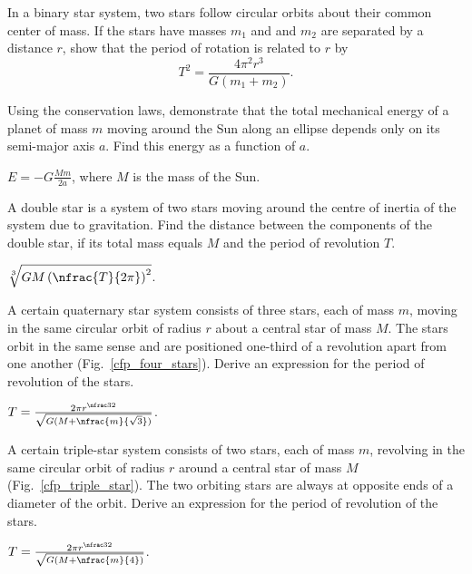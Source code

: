 \begin{problem}
	In a binary star system, two stars follow circular orbits
	about their common center of mass. If the stars have masses $m_1$ and
	and $m_2$ are separated by a distance $r$, show that the period of rotation
	is related to $r$ by
	\[
		T^2  = \frac{4\pi^2 r^3}{G(m_1 + m_2)}.
	\]
\end{problem}


\begin{problem}
	Using the conservation laws, demonstrate that the total 
	mechanical energy of a planet of mass $m$ moving around the Sun 
	along an ellipse depends only on its semi-major axis $a$. Find this 
	energy as a function of $a$. 
	\begin{solution}
		$E = - G\frac{Mm}{2a}$, where $M$ is the mass of the Sun. 		
	\end{solution}
\end{problem}


\begin{problem}
	A double star is a system of two stars moving around the 
	centre of inertia of the system due to gravitation. Find the distance 
	between the components of the double star, if its total mass equals $M$ 
	and the period of revolution $T$. 
	\begin{solution}
		$\sqrt[3]{GM\left(\nfrac{T}{2\pi}\right)^2}$.
	\end{solution}
\end{problem}


\begin{problem}\label{prb:cfp_four_stars}
	A certain quaternary star system consists of three stars,
	each of mass $m$, moving in the same circular orbit of radius
	$r$ about a central star of mass $M$. The stars orbit in the same
	sense and are positioned one-third of a revolution apart
	from one another (Fig.~\ref{cfp_four_stars}). Derive an expression for the period of revolution of the stars.
	\begin{solution}
		$T = \frac{2\pi r ^{\nfrac32}}{\sqrt{G(M + \nfrac{m}{\sqrt3})}}$.
	\end{solution}
\end{problem}


\begin{problem}\label{prb:cfp_triple_star}
	A certain triple-star system consists of two stars, each of mass $m$, revolving in the same circular orbit of radius $r$ around a central star of mass $M$ (Fig.~\ref{cfp_triple_star}). The two orbiting stars are always at opposite ends of a diameter of the orbit. Derive an expression for the period of revolution of the stars.
	\begin{solution}
		$T = \frac{2\pi r ^{\nfrac32}}{\sqrt{G(M + \nfrac{m}{4})}}$.
	\end{solution}
\end{problem}

